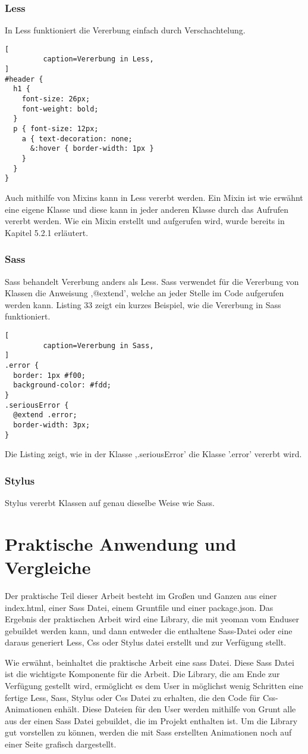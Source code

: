 \subsubsection{Less}
In Less funktioniert die Vererbung einfach durch Verschachtelung.
\begin{lstlisting}[
         caption=Vererbung in Less,
]
#header {
  h1 {
    font-size: 26px;
    font-weight: bold;
  }
  p { font-size: 12px;
    a { text-decoration: none;
      &:hover { border-width: 1px }
    }
  }
}
\end{lstlisting}
Auch mithilfe von Mixins kann in Less vererbt werden. Ein Mixin ist wie erwähnt eine eigene Klasse und diese kann in jeder anderen Klasse durch das Aufrufen vererbt werden. Wie ein Mixin erstellt und aufgerufen wird, wurde bereits in Kapitel 5.2.1 erläutert.
\subsubsection{Sass}
Sass behandelt Vererbung anders als Less. Sass verwendet für die Vererbung von Klassen die Anweisung ,@extend', welche an jeder Stelle im Code aufgerufen werden kann. Listing 33 zeigt ein kurzes Beispiel, wie die Vererbung in Sass funktioniert.
\begin{lstlisting}[
         caption=Vererbung in Sass,
]
.error {
  border: 1px #f00;
  background-color: #fdd;
}
.seriousError {
  @extend .error;
  border-width: 3px;
}
\end{lstlisting}
Die Listing zeigt, wie in der Klasse ,.seriousError' die Klasse '.error' vererbt wird.
\subsubsection{Stylus}
Stylus vererbt Klassen auf genau dieselbe Weise wie Sass. 
\newpage
\section{Praktische Anwendung und Vergleiche}
Der praktische Teil dieser Arbeit besteht im Großen und Ganzen aus einer index.html, einer Sass Datei, einem Gruntfile und einer package.json.  Das Ergebnis der praktischen Arbeit wird eine Library, die mit yeoman vom Enduser gebuildet werden kann, und dann entweder die enthaltene Sass-Datei oder eine daraus generiert Less, Css oder Stylus datei erstellt und zur Verfügung stellt.

Wie erwähnt, beinhaltet die praktische Arbeit eine sass Datei. Diese Sass Datei ist die wichtigste Komponente für die Arbeit. Die Library, die am  Ende zur Verfügung gestellt wird, ermöglicht es dem User in möglichst wenig Schritten eine fertige Less, Sass, Stylus oder Css Datei zu erhalten, die den Code für Css-Animationen enhält. Diese Dateien für den User werden mithilfe von Grunt alle aus der einen Sass Datei gebuildet, die im Projekt enthalten ist.\newline
Um die Library gut vorstellen zu können, werden die mit Sass erstellten Animationen noch auf einer Seite grafisch dargestellt.\newline


